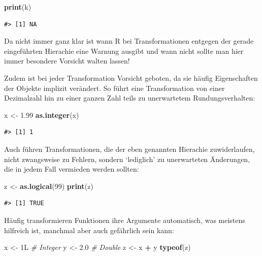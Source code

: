 \documentclass[]{book}
\newenvironment{Shaded}{\begin{snugshade}}{\end{snugshade}}
\newcommand{\KeywordTok}[1]{\textcolor[rgb]{0.13,0.29,0.53}{\textbf{#1}}}
\newcommand{\DecValTok}[1]{\textcolor[rgb]{0.00,0.00,0.81}{#1}}
\newcommand{\FloatTok}[1]{\textcolor[rgb]{0.00,0.00,0.81}{#1}}
\newcommand{\StringTok}[1]{\textcolor[rgb]{0.31,0.60,0.02}{#1}}
\newcommand{\CommentTok}[1]{\textcolor[rgb]{0.56,0.35,0.01}{\textit{#1}}}
\newcommand{\OperatorTok}[1]{\textcolor[rgb]{0.81,0.36,0.00}{\textbf{#1}}}
\newcommand{\NormalTok}[1]{#1}
\begin{document}
\begin{Shaded}
\begin{Highlighting}[]
\KeywordTok{print}\NormalTok{(k)}
\end{Highlighting}
\end{Shaded}

\begin{verbatim}
#> [1] NA
\end{verbatim}

Da nicht immer ganz klar ist wann R bei Transformationen entgegen der
gerade eingeführten Hierachie eine Warnung ausgibt und wann nicht sollte
man hier immer besondere Vorsicht walten lassen!

Zudem ist bei jeder Transformation Vorsicht geboten, da sie häufig
Eigenschaften der Objekte implizit verändert. So führt eine
Transformation von einer Dezimalzahl hin zu einer ganzen Zahl teils zu
unerwartetem Rundungsverhalten:

\begin{Shaded}
\begin{Highlighting}[]
\NormalTok{x <-}\StringTok{ }\FloatTok{1.99}
\KeywordTok{as.integer}\NormalTok{(x)}
\end{Highlighting}
\end{Shaded}

\begin{verbatim}
#> [1] 1
\end{verbatim}

Auch führen Transformationen, die der eben genannten Hierachie
zuwiderlaufen, nicht zwangsweise zu Fehlern, sondern `lediglich' zu
unerwarteten Änderungen, die in jedem Fall vermieden werden sollten:

\begin{Shaded}
\begin{Highlighting}[]
\NormalTok{z <-}\StringTok{ }\KeywordTok{as.logical}\NormalTok{(}\DecValTok{99}\NormalTok{)}
\KeywordTok{print}\NormalTok{(z)}
\end{Highlighting}
\end{Shaded}

\begin{verbatim}
#> [1] TRUE
\end{verbatim}

Häufig transformieren Funktionen ihre Argumente automatisch, was
meistens hilfreich ist, manchmal aber auch gefährlich sein kann:

\begin{Shaded}
\begin{Highlighting}[]
\NormalTok{x <-}\StringTok{ }\NormalTok{1L }\CommentTok{# Integer}
\NormalTok{y <-}\StringTok{ }\FloatTok{2.0} \CommentTok{# Double}
\NormalTok{z <-}\StringTok{ }\NormalTok{x }\OperatorTok{+}\StringTok{ }\NormalTok{y}
\KeywordTok{typeof}\NormalTok{(z)}
\end{Highlighting}
\end{Shaded}
\end{document}
